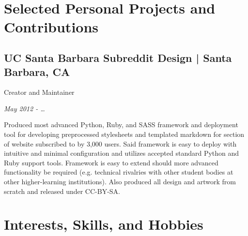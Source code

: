 \documentclass[10pt, letter]{article}
\newcommand{\years}[1]{\marginnote{#1}}
\renewcommand{\years}[1]{{\emph{#1}}}
\begin{document}
\begin{multicols}{2}
\section*{Selected Personal Projects and Contributions}

\subsection*{UC Santa Barbara Subreddit Design | {\footnotesize{Santa Barbara, CA}}}

Creator and Maintainer

\years{May 2012 - \ldots}

Produced most advanced Python, Ruby, and SASS framework and deployment tool for
developing preprocessed stylesheets and templated markdown for section of
website subscribed to by 3,000 users. Said framework is easy to deploy with
intuitive and minimal configuration and utilizes accepted standard Python and
Ruby support tools. Framework is easy to extend should more advanced
functionality be required (e.g. technical rivalries with other student bodies
at other higher-learning institutions). Also produced all design and artwork
from scratch and released under CC-BY-SA.

\section*{Interests, Skills, and Hobbies}


\end{multicols}
\end{document}
